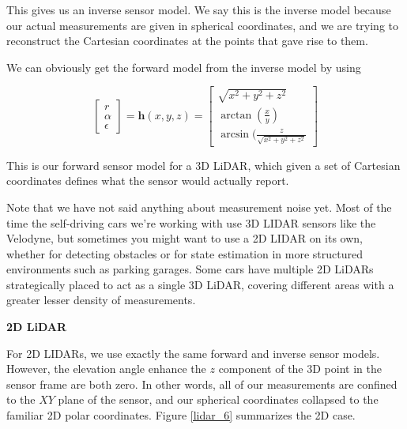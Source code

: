 This gives us an inverse sensor model. We say this is the inverse model because our actual measurements are
given in spherical coordinates, and we are trying to
reconstruct the Cartesian coordinates at the points
that gave rise to them. 

\begin{framed}
\theoremstyle{remark}
\begin{remark}{}

We can obviously get the forward model from the inverse model by using

\begin{equation}
\begin{bmatrix}
r \\
\alpha \\
\epsilon 
\end{bmatrix} = \mathbf{h}(x, y, z) = 
\begin{bmatrix}
\sqrt{x^2 + y^2 + z^2} \\
\arctan(\frac{x}{y}) \\
\arcsin(\frac{z}{\sqrt{x^2 + y^2 + z^2}} 
\end{bmatrix} 
\end{equation}

This is our forward sensor
model for a 3D LiDAR, which given a set of Cartesian coordinates defines what
the sensor would actually report.
\end{remark}
\end{framed}

Note that we have not said anything
about measurement noise yet. Most of the time the
self-driving cars we're working with use 3D LIDAR sensors
like the Velodyne, but sometimes you might want
to use a 2D LIDAR on its own, whether for detecting obstacles
or for state estimation in more structured environments
such as parking garages. Some cars have multiple 2D LiDARs strategically placed to
act as a single 3D LiDAR, covering different areas with a greater lesser density of measurements. 


\begin{framed}
\theoremstyle{remark}
\begin{remark}{\textbf{2D LiDAR}}

For 2D LIDARs, we use exactly the same forward and inverse sensor models. However, the elevation angle
enhance the $z$ component of the 3D point in the sensor frame are both zero. In other words, all of
our measurements are confined to the $XY$ plane of the sensor, and our spherical
coordinates collapsed to the familiar 2D polar coordinates. Figure \ref{lidar_6} summarizes the 2D case.
\end{remark}
\end{framed}

